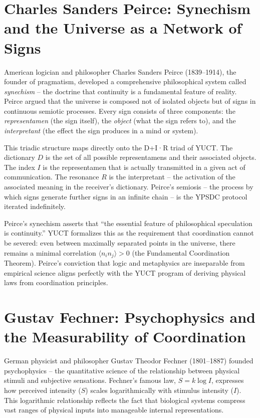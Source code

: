 \documentclass[12pt,a4paper]{article}
\begin{document}
	\section{Charles Sanders Peirce: Synechism and the Universe as a Network of Signs}
	
	American logician and philosopher Charles Sanders Peirce (1839–1914), the founder of pragmatism, developed a comprehensive philosophical system called \emph{synechism} -- the doctrine that continuity is a fundamental feature of reality. Peirce argued that the universe is composed not of isolated objects but of signs in continuous semiotic processes. Every sign consists of three components: the \emph{representamen} (the sign itself), the \emph{object} (what the sign refers to), and the \emph{interpretant} (the effect the sign produces in a mind or system).
	
	This triadic structure maps directly onto the D+I·R triad of YUCT. The dictionary \(D\) is the set of all possible representamens and their associated objects. The index \(I\) is the representamen that is actually transmitted in a given act of communication. The resonance \(R\) is the interpretant -- the activation of the associated meaning in the receiver's dictionary. Peirce's semiosis -- the process by which signs generate further signs in an infinite chain -- is the YPSDC protocol iterated indefinitely.
	
	Peirce's synechism asserts that ``the essential feature of philosophical speculation is continuity.'' YUCT formalizes this as the requirement that coordination cannot be severed: even between maximally separated points in the universe, there remains a minimal correlation \(\langle n_i n_j \rangle > 0\) (the Fundamental Coordination Theorem). Peirce's conviction that logic and metaphysics are inseparable from empirical science aligns perfectly with the YUCT program of deriving physical laws from coordination principles.
	
	\section{Gustav Fechner: Psychophysics and the Measurability of Coordination}
	
	German physicist and philosopher Gustav Theodor Fechner (1801–1887) founded psychophysics -- the quantitative science of the relationship between physical stimuli and subjective sensations. Fechner's famous law, \(S = k \log I\), expresses how perceived intensity (\(S\)) scales logarithmically with stimulus intensity (\(I\)). This logarithmic relationship reflects the fact that biological systems compress vast ranges of physical inputs into manageable internal representations.
	
\end{document}
